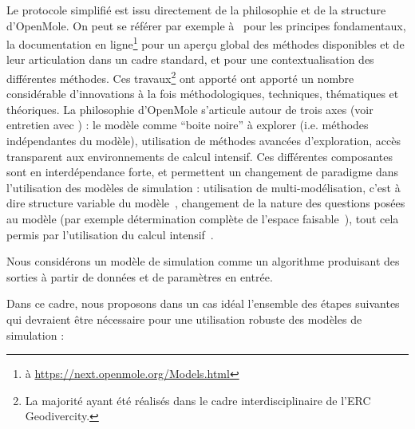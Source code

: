 Le protocole simplifié est issu directement de la philosophie et de la structure d'OpenMole. On peut se référer par exemple à~\cite{reuillon2013openmole} pour les principes fondamentaux, la documentation en ligne\footnote{à \url{https://next.openmole.org/Models.html}} pour un aperçu global des méthodes disponibles et de leur articulation dans un cadre standard, et \cite{pumain2017innovative} pour une contextualisation des différentes méthodes. Ces travaux\footnote{La majorité ayant été réalisés dans le cadre interdisciplinaire de l'ERC Geodivercity.} ont apporté ont apporté un nombre considérable d'innovations à la fois méthodologiques, techniques, thématiques et théoriques. La philosophie d'OpenMole s'articule autour de trois axes (voir entretien avec ) : le modèle comme ``boite noire'' à explorer (i.e. méthodes indépendantes du modèle), utilisation de méthodes avancées d'exploration, accès transparent aux environnements de calcul intensif. Ces différentes composantes sont en interdépendance forte, et permettent un changement de paradigme dans l'utilisation des modèles de simulation : utilisation de multi-modélisation, c'est à dire structure variable du modèle~\cite{cottineau2015modular}, changement de la nature des questions posées au modèle (par exemple détermination complète de l'espace faisable~\cite{10.1371/journal.pone.0138212}), tout cela permis par l'utilisation du calcul intensif~\cite{schmitt2014half}.



Nous considérons un modèle de simulation comme un algorithme produisant des sorties à partir de données et de paramètres en entrée.

Dans ce cadre, nous proposons dans un cas idéal l'ensemble des étapes suivantes qui devraient être nécessaire pour une utilisation robuste des modèles de simulation :

